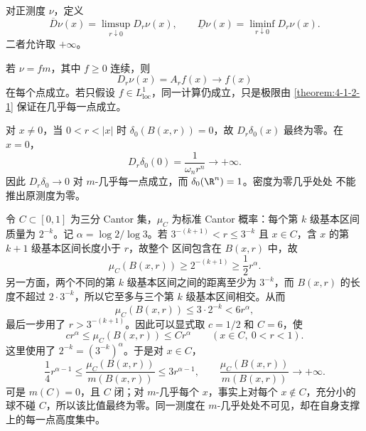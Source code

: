 \begin{definition}[上、下密度]\label{def:4-1-3-3}
对正测度 $\nu$，定义
\[
 \overline D\nu(x)=\limsup_{r\downarrow0}D_r\nu(x),\qquad
 \underline D\nu(x)=\liminf_{r\downarrow0}D_r\nu(x).
\]
二者允许取 $+\infty$。
\end{definition}

\begin{example}[连续密度]\label{ex:4-1-3-1}
若 $\nu=fm$，其中 $f\ge0$ 连续，则
\[
 D_r\nu(x)=A_rf(x)\longrightarrow f(x)
\]
在每个点成立。若只假设 $f\in L^1_{\mathrm{loc}}$，同一计算仍成立，只是极限由
\cref{theorem:4-1-2-1} 保证在几乎每一点成立。
\end{example}

\begin{example}[Dirac 测度]\label{ex:4-1-3-2}
对 $x\ne0$，当 $0<r<|x|$ 时 $\delta_0(B(x,r))=0$，故
$D_r\delta_0(x)$ 最终为零。在 $x=0$，
\[
 D_r\delta_0(0)=\frac1{\omega_nr^n}\longrightarrow+\infty.
\]
因此 $D_r\delta_0\to0$ 对 $m$-几乎每一点成立，而 $\delta_0(\R^n)=1$。密度为零几乎处处
不能推出原测度为零。
\end{example}

\begin{example}[Cantor 测度]\label{ex:4-1-3-3}
令 $C\subset[0,1]$ 为三分 Cantor 集，$\mu_C$ 为标准 Cantor 概率：每个第 $k$ 级基本区间
质量为 $2^{-k}$。记 $\alpha=\log2/\log3$。若
$3^{-(k+1)}<r\le3^{-k}$ 且 $x\in C$，含 $x$ 的第 $k+1$ 级基本区间长度小于 $r$，故整个
区间包含在 $B(x,r)$ 中，故
\[
 \mu_C(B(x,r))\ge2^{-(k+1)}\ge\frac12r^\alpha.
\]
另一方面，两个不同的第 $k$ 级基本区间之间的距离至少为 $3^{-k}$，而
$B(x,r)$ 的长度不超过 $2\cdot3^{-k}$，所以它至多与三个第 $k$ 级基本区间相交。从而
\[
 \mu_C(B(x,r))\le3\cdot2^{-k}<6r^\alpha,
\]
最后一步用了 $r>3^{-(k+1)}$。因此可以显式取 $c=1/2$ 和 $C=6$，使
\[
 c r^\alpha\le\mu_C(B(x,r))\le C r^\alpha
 \qquad(x\in C,\ 0<r<1).
\]
这里使用了 $2^{-k}=(3^{-k})^\alpha$。于是对 $x\in C$，
\[
 \frac14r^{\alpha-1}
 \le\frac{\mu_C(B(x,r))}{m(B(x,r))}
 \le3r^{\alpha-1},
 \qquad
 \frac{\mu_C(B(x,r))}{m(B(x,r))}\longrightarrow+\infty.
\]
可是 $m(C)=0$，且 $C$ 闭；对 $m$-几乎每个 $x$，事实上对每个 $x\notin C$，充分小的球不碰
$C$，所以该比值最终为零。同一测度在 $m$-几乎处处不可见，却在自身支撑上的每一点高度集中。
\end{example}

